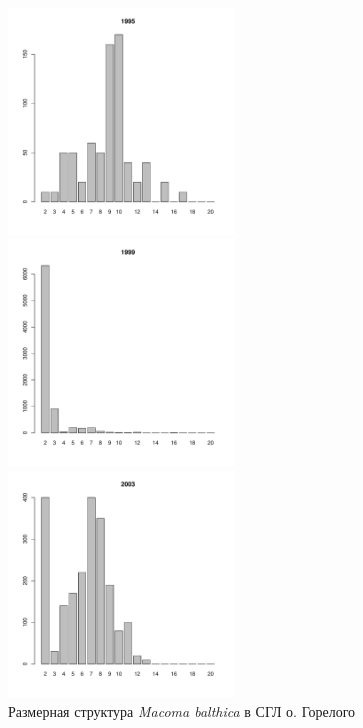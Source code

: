 \begin{figure}[hp]
	\begin{minipage}[b]{.3\linewidth}
	\begin{center}
	\includegraphics[width=60mm]{../White_Sea/Luvenga_Goreliy/middle2_1995_.pdf}
	\end{center}
	\end{minipage}
	\hfill
	\begin{minipage}[b]{.3\linewidth}
	\begin{center}
	\includegraphics[width=60mm]{../White_Sea/Luvenga_Goreliy/middle2_1999_.pdf}
	\end{center}
	\end{minipage}
	\hfill
	\begin{minipage}[b]{.3\linewidth}
	\begin{center}
	\includegraphics[width=60mm]{../White_Sea/Luvenga_Goreliy/middle2_2003_.pdf}
	\end{center}
	\end{minipage}
\caption{Размерная структура {\it Macoma balthica} в СГЛ о. Горелого}
\label{ris:size_str_Goreliy_mid}
\end{figure}

